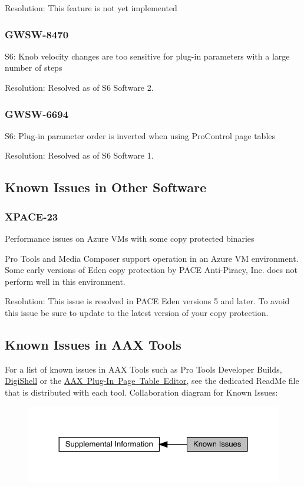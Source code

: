 Resolution\+: This feature is not yet implemented\hypertarget{a00846_GWSW-8470}{}\subsubsection{G\+W\+S\+W-\/8470}\label{a00846_GWSW-8470}
S6\+: Knob velocity changes are too sensitive for plug-\/in parameters with a large number of steps

Resolution\+: Resolved as of S6 Software 2.\hypertarget{a00846_GWSW-6694}{}\subsubsection{G\+W\+S\+W-\/6694}\label{a00846_GWSW-6694}
S6\+: Plug-\/in parameter order is inverted when using Pro\+Control page tables

Resolution\+: Resolved as of S6 Software 1.\hypertarget{a00846_knownissues_other}{}\subsection{Known Issues in Other Software}\label{a00846_knownissues_other}
\hypertarget{a00846_XPACE-23}{}\subsubsection{X\+P\+A\+C\+E-\/23}\label{a00846_XPACE-23}
Performance issues on Azure V\+Ms with some copy protected binaries

Pro Tools and Media Composer support operation in an Azure VM environment. Some early versions of Eden copy protection by P\+A\+CE Anti-\/\+Piracy, Inc. does not perform well in this environment.

Resolution\+: This issue is resolved in P\+A\+CE Eden versions 5 and later. To avoid this issue be sure to update to the latest version of your copy protection.\hypertarget{a00846_knownissues_tools}{}\subsection{Known Issues in A\+A\+X Tools}\label{a00846_knownissues_tools}
For a list of known issues in A\+AX Tools such as Pro Tools Developer Builds, \mbox{\hyperlink{a00835}{Digi\+Shell}} or the \mbox{\hyperlink{a00833_subsection_creating_page_tables_in_pete}{A\+AX Plug-\/\+In Page Table Editor}}, see the dedicated Read\+Me file that is distributed with each tool. Collaboration diagram for Known Issues\+:
\nopagebreak
\begin{figure}[H]
\begin{center}
\leavevmode
\includegraphics[width=324pt]{a00846}
\end{center}
\end{figure}

